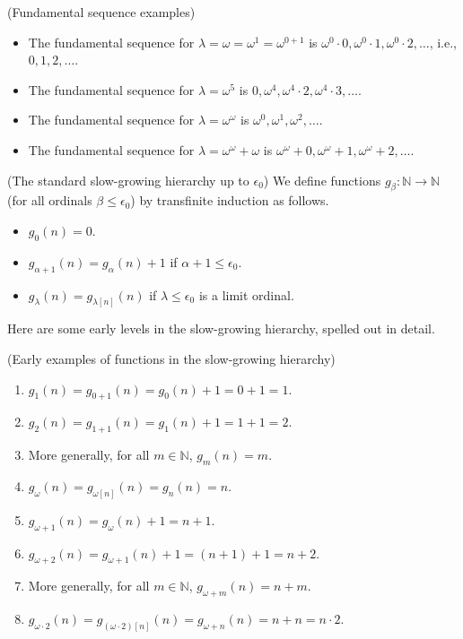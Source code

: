 \documentclass[twoside,11pt]{article}
\begin{document}
\begin{example}
    (Fundamental sequence examples)
    \begin{itemize}
        \item
        The fundamental sequence for $\lambda=\omega=\omega^1=\omega^{0+1}$ is
        $\omega^0\cdot 0, \omega^0\cdot 1, \omega^0\cdot 2, \ldots$,
        i.e., $0, 1, 2, \ldots$.
        \item
        The fundamental sequence for $\lambda=\omega^5$ is
        $0,\omega^4,\omega^4\cdot 2,\omega^4\cdot 3,\ldots$.
        \item
        The fundamental sequence for $\lambda=\omega^\omega$ is
        $\omega^0,\omega^1,\omega^2,\ldots$.
        \item
        The fundamental sequence for $\lambda=\omega^\omega+\omega$ is
        $\omega^\omega+0,\omega^\omega+1,\omega^\omega+2,\ldots$.
    \end{itemize}
\end{example}

\begin{definition}
\label{slowgrowinghierarchydefn}
    (The standard slow-growing hierarchy up to $\epsilon_0$)
    We define functions $g_\beta:\mathbb N\to\mathbb N$ (for all ordinals
    $\beta\leq \epsilon_0$) by transfinite induction as follows.
    \begin{itemize}
        \item
        $g_0(n)=0$.
        \item
        $g_{\alpha+1}(n) = g_\alpha(n) + 1$ if $\alpha+1\leq\epsilon_0$.
        \item
        $g_{\lambda}(n) = g_{\lambda[n]}(n)$ if $\lambda\leq\epsilon_0$ is a limit ordinal.
    \end{itemize}
\end{definition}

Here are some early levels in the slow-growing hierarchy, spelled out in detail.

\begin{example}
\label{highdetailslowgrowingexample}
    (Early examples of functions in the slow-growing hierarchy)
    \begin{enumerate}
        \item
        $g_1(n)=g_{0+1}(n)=g_0(n)+1=0+1=1$.
        \item
        $g_2(n)=g_{1+1}(n)=g_1(n)+1=1+1=2$.
        \item
        More generally, for all $m\in\mathbb N$,
        $g_m(n)=m$.
        \item
        $g_\omega(n)=g_{\omega[n]}(n)=g_n(n)=n$.
        \item
        $g_{\omega+1}(n)=g_{\omega}(n)+1=n+1$.
        \item
        $g_{\omega+2}(n)=g_{\omega+1}(n)+1=(n+1)+1=n+2$.
        \item
        More generally, for all $m\in\mathbb N$,
        $g_{\omega+m}(n)=n+m$.
        \item
        $g_{\omega\cdot 2}(n)=g_{(\omega\cdot 2)[n]}(n)
        =g_{\omega+n}(n)=n+n=n\cdot 2$.
    \end{enumerate}
\end{example}
\end{document}
